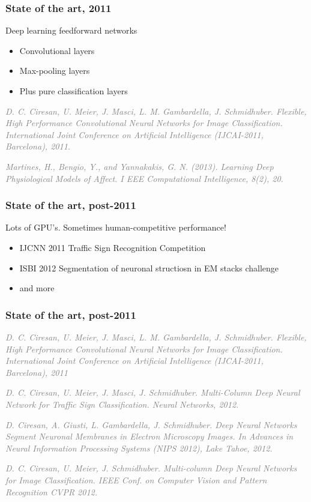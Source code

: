 \documentclass[t]{beamer}
\newcommand\smallgray[1]{\textcolor{gray}{\small\it #1}}
\newcommand\prevwork[1]{\smallgray{#1}}
\begin{document}
\begin{frame}
  \frametitle{State of the art, 2011}

  Deep learning feedforward networks
  \begin{itemize}
  \item Convolutional layers
  \item Max-pooling layers
  \item Plus pure classification layers
  \end{itemize}

  \prevwork{D. C. Ciresan, U. Meier, J. Masci, L. M. Gambardella,
    J. Schmidhuber. Flexible, High Performance Convolutional Neural
    Networks for Image Classification. International Joint Conference
    on Artificial Intelligence (IJCAI-2011, Barcelona), 2011.}

  \prevwork{Martines, H., Bengio, Y., and Yannakakis,
    G. N. (2013). Learning Deep Physiological Models of Affect. I EEE
    Computational Intelligence, 8(2), 20.}
\end{frame}

\begin{frame}
  \frametitle{State of the art, post-2011}
  
  Lots of GPU's.  Sometimes human-competitive performance!
  \begin{itemize}
  \item IJCNN 2011 Traffic Sign Recognition Competition
  \item ISBI 2012 Segmentation of neuronal structiosn in EM stacks challenge
  \item and more
  \end{itemize}

\end{frame}

\begin{frame}
  \frametitle{State of the art, post-2011}
  
  \prevwork{D. C. Ciresan, U. Meier, J. Masci, L. M. Gambardella,
    J. Schmidhuber. Flexible, High Performance Convolutional Neural
    Networks for Image Classification. International Joint Conference
    on Artificial Intelligence (IJCAI-2011, Barcelona), 2011}

  \prevwork{D. C. Ciresan, U. Meier, J. Masci,
    J. Schmidhuber. Multi-Column Deep Neural Network for Traffic Sign
    Classification. Neural Networks, 2012.}

  \prevwork{D. Ciresan, A. Giusti, L. Gambardella,
    J. Schmidhuber. Deep Neural Networks Segment Neuronal Membranes in
    Electron Microscopy Images. In Advances in Neural Information
    Processing Systems (NIPS 2012), Lake Tahoe, 2012.}

  \prevwork{D. C. Ciresan, U. Meier, J. Schmidhuber. Multi-column Deep
    Neural Networks for Image Classification. IEEE Conf. on Computer
    Vision and Pattern Recognition CVPR 2012.}

\end{frame}
\end{document}
